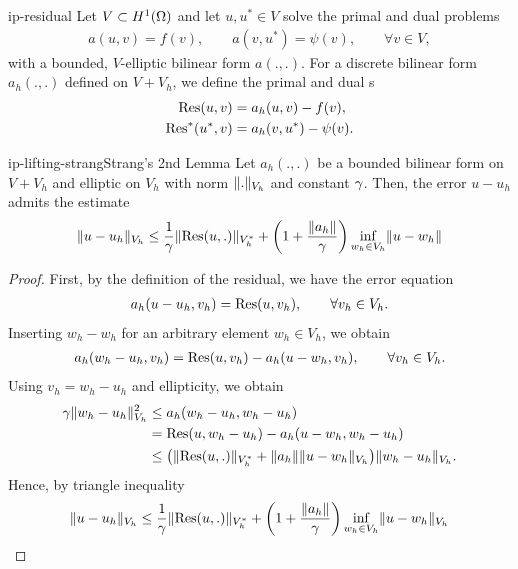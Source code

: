 \begin{Definition}{ip-residual}
  Let $V\subset H^1(\Omega)$ and let $u,u^*\in V$ solve the primal
  and dual problems
  \begin{gather}
    a(u,v) = f(v),
    \qquad
    a(v,u^*) = \psi(v),
    \qquad
    \forall v\in V,
  \end{gather}
  with a bounded, $V$-elliptic bilinear form $a(.,.)$. For a discrete
  bilinear form $a_h(.,.)$ defined on $V+V_h$, we define the primal
  and dual s
  \begin{gather}
    \label{eq:ip-lifting:8}
    \begin{split}
      \operatorname{Res}(u,v) &= a_h(u,v) - f(v), \\
      \operatorname{Res}^*(u^*,v) &= a_h(v,u^*) - \psi(v).
    \end{split}
  \end{gather}
\end{Definition}

\begin{Lemma*}{ip-lifting-strang}{Strang's 2nd Lemma}
  Let $a_h(.,.)$ be a bounded bilinear form on $V+V_h$ and elliptic on
  $V_h$ with norm $\lVert.\rVert_{V_h}$ and constant $\gamma$. Then, the error
  $u-u_h$ admits the estimate
  \begin{gather}
    \label{eq:ip-lifting:9}
    \lVert u-u_h\rVert_{V_h} \le \frac1{\gamma}
    \lVert\operatorname{Res}(u,.)\rVert_{V_h^*}
    + \left(1+\frac{\lVert a_h\rVert}{\gamma}\right)
    \inf_{w_h\in V_h}\lVert u-w_h\rVert
  \end{gather}
\end{Lemma*}

\begin{proof}
  First, by the definition of the residual, we have the error equation
  \begin{gather}
    a_h(u-u_h, v_h) = \operatorname{Res}(u,v_h),\qquad\forall v_h\in V_h.
  \end{gather}
  Inserting $w_h-w_h$ for an arbitrary element $w_h\in V_h$, we obtain
  \begin{gather*}
    a_h(w_h-u_h, v_h) = \operatorname{Res}(u,v_h) - a_h(u-w_h, v_h),\qquad\forall v_h\in V_h.
  \end{gather*}
  Using $v_h = w_h-u_h$ and ellipticity, we obtain
  \begin{align*}
    \gamma \lVert w_h-u_h\rVert_{V_h}^2
    &\le a_h(w_h-u_h,w_h-u_h)\\
    & = \operatorname{Res}(u,w_h-u_h) - a_h(u-w_h, w_h-u_h)\\
    & \le \bigl(\lVert\operatorname{Res}(u,.)\rVert_{V_h^*} + \lVert a_h\rVert \lVert u-w_h\rVert_{V_h}\bigr)
      \lVert w_h-u_h\rVert_{V_h}.
  \end{align*}
  Hence, by triangle inequality
  \begin{gather*}
    \lVert u-u_h\rVert_{V_h} \le \frac1{\gamma} \lVert\operatorname{Res}(u,.)\rVert_{V_h^*}
    + \left(1+\frac{\lVert a_h\rVert}{\gamma}\right)
    \inf_{w_h\in V_h}\lVert u-w_h\rVert_{V_h}
  \end{gather*}
\end{proof}

